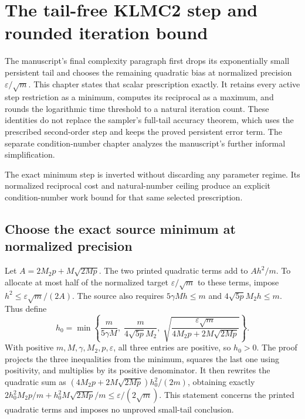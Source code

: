 \documentclass[11pt,a4paper]{report}
\begin{document}
\section{\texorpdfstring{The tail-free KLMC2 step and rounded iteration bound}{The tail-free KLMC2 step and rounded iteration bound}}
\label{proof-module-KineticLangevin-SecondOrderComplexity-lean}


The manuscript's final complexity paragraph first drops its exponentially small persistent tail and chooses the remaining quadratic bias at normalized precision \(\varepsilon/\sqrt m\). This chapter states that scalar prescription exactly. It retains every active step restriction as a minimum, computes its reciprocal as a maximum, and rounds the logarithmic time threshold to a natural iteration count. These identities do not replace the sampler's full-tail accuracy theorem, which uses the prescribed second-order step and keeps the proved persistent error term. The separate condition-number chapter analyzes the manuscript's further informal simplification.



The exact minimum step is inverted without discarding any parameter regime. Its normalized reciprocal cost and natural-number ceiling produce an explicit condition-number work bound for that same selected prescription.

\subsection{\texorpdfstring{Choose the exact source minimum at normalized precision}{Choose the exact source minimum at normalized precision}}
\label{report-step-KineticLangevin-SecondOrderComplexity-lean-1}


Let \(A=2M_2p+M\sqrt{2Mp}\). The two printed quadratic terms add to \(A h^2/m\). To allocate at most half of the normalized target \(\varepsilon/\sqrt m\) to these terms, impose \(h^2\le\varepsilon\sqrt m/(2A)\). The source also requires \(5\gamma Mh\le m\) and \(4\sqrt{5p}M_2h\le m\). Thus define \[h_0=\min\!\left\{\frac{m}{5\gamma M},\;\frac{m}{4\sqrt{5p}M_2},\;\sqrt{\frac{\varepsilon\sqrt m}{4M_2p+2M\sqrt{2Mp}}}\right\}.\] With positive \(m,M,\gamma,M_2,p,\varepsilon\), all three entries are positive, so \(h_0>0\). The proof projects the three inequalities from the minimum, squares the last one using positivity, and multiplies by its positive denominator. It then rewrites the quadratic sum as \((4M_2p+2M\sqrt{2Mp})h_0^2/(2m)\), obtaining exactly \(2h_0^2M_2p/m+h_0^2M\sqrt{2Mp}/m\le\varepsilon/(2\sqrt m)\). This statement concerns the printed quadratic terms and imposes no unproved small-tail conclusion.
\end{document}
